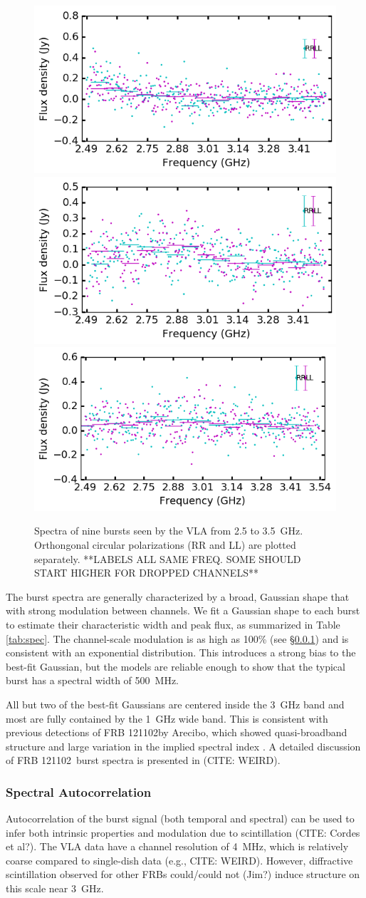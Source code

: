 \documentclass[twocolumn]{aastex61}
\newcommand{\frb}{FRB 121102}
\begin{document}
\begin{figure}[ht]
\begin{center}
 \begin{minipage}{2\columnwidth}
  \includegraphics[width=0.3\columnwidth]{spec_57646.png}
  \includegraphics[width=0.3\columnwidth]{spec_57648.png}
  \includegraphics[width=0.3\columnwidth]{spec_57649.png}
 \end{minipage}
\caption{Spectra of nine bursts seen by the VLA from 2.5 to 3.5~GHz. Orthongonal circular polarizations (RR and LL) are plotted separately. **LABELS ALL SAME FREQ. SOME SHOULD START HIGHER FOR DROPPED CHANNELS**
\label{fig:spec}}
\end{center}
\end{figure}

The burst spectra are generally characterized by a broad, Gaussian shape that with strong modulation between channels. We fit a Gaussian shape to each burst to estimate their characteristic width and peak flux, as summarized in Table \ref{tab:spec}. The channel-scale modulation is as high as 100\% (see \S \ref{sec:auto}) and is consistent with an exponential distribution. This introduces a strong bias to the best-fit Gaussian, but the models are reliable enough to show that the typical burst has a spectral width of 500~MHz.

All but two of the best-fit Gaussians are centered inside the 3~GHz band and most are fully contained by the 1~GHz wide band. This is consistent with previous detections of \frb by Arecibo, which showed quasi-broadband structure \citep{2016arXiv160308880S} and large variation in the implied spectral index \citep{2014ApJ...790..101S}. A detailed discussion of \frb\ burst spectra is presented in (CITE: WEIRD).

\subsubsection{Spectral Autocorrelation}
\label{sec:auto}
Autocorrelation of the burst signal (both temporal and spectral) can be used to infer both intrinsic properties and modulation due to scintillation (CITE: Cordes et al?). The VLA data have a channel resolution of 4~MHz, which is relatively coarse compared to single-dish data (e.g., CITE: WEIRD). However, diffractive scintillation observed for other FRBs \citep{} {\color{red}could/could not (Jim?)} induce structure on this scale near 3~GHz.
\end{document}
